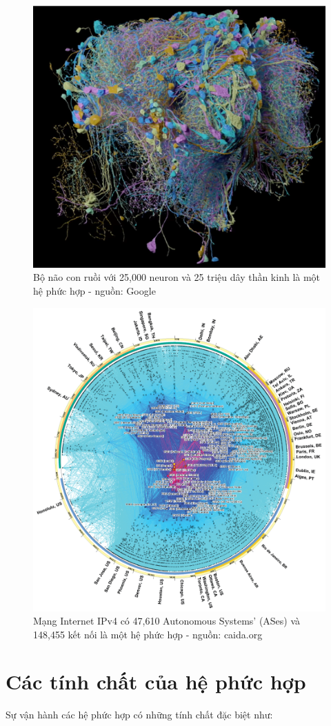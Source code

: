 \documentclass[]{book}
\begin{document}
\begin{figure}

{\centering \includegraphics[width=0.5\linewidth]{images/flybrain} 

}

\caption{Bộ não con ruồi với 25,000 neuron và 25 triệu dây thần kinh là một hệ phức hợp - nguồn: Google}\label{fig:flybrain}
\end{figure}\begin{figure}

{\centering \includegraphics[width=0.5\linewidth]{images/internet2020} 

}

\caption{Mạng Internet IPv4 có 47,610 Autonomous Systems' (ASes) và 148,455 kết nối là một hệ phức hợp - nguồn: caida.org}\label{fig:internet}
\end{figure}

\section{Các tính chất của hệ phức hợp}\label{cac-tinh-cht-cua-h-phc-hp}

Sự vận hành các hệ phức hợp có những tính chất đặc biệt như:
\end{document}
